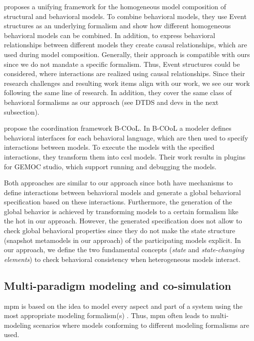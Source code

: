 \documentclass{jot}
\begin{document}
\cite{kienzleUnifyingFrameworkHomogeneous2019} proposes a unifying framework for the homogeneous model composition of structural and behavioral models.
To combine behavioral models, they use Event structures as an underlying formalism and show how different homogeneous behavioral models can be combined.
In addition, to express behavioral relationships between different models they create causal relationships, which are used during model composition. 
Generally, their approach is compatible with ours since we do not mandate a specific formalism.
Thus, Event structures could be considered, where interactions are realized using causal relationships.
Since their research challenges and resulting work items align with our work, we see our work following the same line of research.
In addition, they cover the same class of behavioral formalisms as our approach (see DTDS and \acrshort*{devs} in the next subsection).

\cite{varalarsenBehavioralCoordinationOperator2015} propose the coordination framework B-COoL.
In B-COoL a modeler defines behavioral interfaces for each behavioral language, which are then used to specify interactions between models.
To execute the models with the specified interactions, they transform them into \gls*{ccsl} models.  
Their work results in plugins for GEMOC studio, which support running and debugging the models.

Both approaches \cite{kienzleUnifyingFrameworkHomogeneous2019,varalarsenBehavioralCoordinationOperator2015} are similar to our approach since both have mechanisms to define interactions between behavioral models and generate a global behavioral specification based on these interactions.
Furthermore, the generation of the global behavior is achieved by transforming models to a certain formalism like the \gls*{hot} in our approach.
However, the generated specification does not allow to check global behavioral properties since they do not make the state structure (snapshot metamodels in our approach) of the participating models explicit.
In our approach, we define the two fundamental concepts (\textit{state} and \textit{state-changing elements}) to check behavioral consistency when heterogeneous models interact.

\subsection{Multi-paradigm modeling and co-simulation}
\gls*{mpm} is based on the idea to model every aspect and part of a system using the most appropriate modeling formalism(s) \cite{amraniMultiparadigmModellingCyber2021}.
Thus, \gls*{mpm} often leads to multi-modeling scenarios where models conforming to different modeling formalisms are used.
\end{document}

